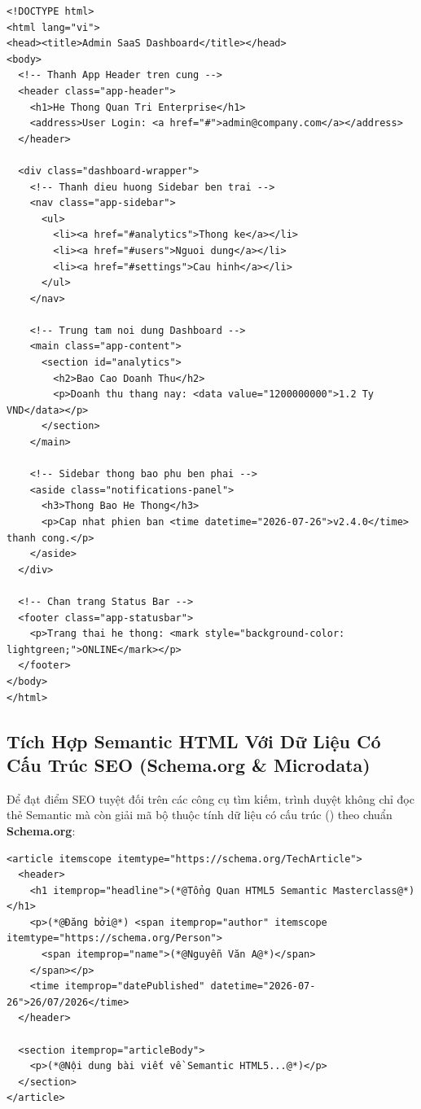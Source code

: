 \begin{codeWindowBreakable}
\begin{lstlisting}[language=HTML5]
<!DOCTYPE html>
<html lang="vi">
<head><title>Admin SaaS Dashboard</title></head>
<body>
  <!-- Thanh App Header tren cung -->
  <header class="app-header">
    <h1>He Thong Quan Tri Enterprise</h1>
    <address>User Login: <a href="#">admin@company.com</a></address>
  </header>

  <div class="dashboard-wrapper">
    <!-- Thanh dieu huong Sidebar ben trai -->
    <nav class="app-sidebar">
      <ul>
        <li><a href="#analytics">Thong ke</a></li>
        <li><a href="#users">Nguoi dung</a></li>
        <li><a href="#settings">Cau hinh</a></li>
      </ul>
    </nav>

    <!-- Trung tam noi dung Dashboard -->
    <main class="app-content">
      <section id="analytics">
        <h2>Bao Cao Doanh Thu</h2>
        <p>Doanh thu thang nay: <data value="1200000000">1.2 Ty VND</data></p>
      </section>
    </main>

    <!-- Sidebar thong bao phu ben phai -->
    <aside class="notifications-panel">
      <h3>Thong Bao He Thong</h3>
      <p>Cap nhat phien ban <time datetime="2026-07-26">v2.4.0</time> thanh cong.</p>
    </aside>
  </div>

  <!-- Chan trang Status Bar -->
  <footer class="app-statusbar">
    <p>Trang thai he thong: <mark style="background-color: lightgreen;">ONLINE</mark></p>
  </footer>
</body>
</html>
\end{lstlisting}
\end{codeWindowBreakable}

\clearpage
\subsection{Tích Hợp Semantic HTML Với Dữ Liệu Có Cấu Trúc SEO (Schema.org \& Microdata)}

Để đạt điểm SEO tuyệt đối trên các công cụ tìm kiếm, trình duyệt không chỉ đọc thẻ Semantic mà còn giải mã bộ thuộc tính dữ liệu có cấu trúc () theo chuẩn \textbf{Schema.org}:

\begin{codeWindow}
\begin{lstlisting}[language=HTML5]
<article itemscope itemtype="https://schema.org/TechArticle">
  <header>
    <h1 itemprop="headline">(*@Tổng Quan HTML5 Semantic Masterclass@*)</h1>
    <p>(*@Đăng bởi@*) <span itemprop="author" itemscope itemtype="https://schema.org/Person">
      <span itemprop="name">(*@Nguyễn Văn A@*)</span>
    </span></p>
    <time itemprop="datePublished" datetime="2026-07-26">26/07/2026</time>
  </header>

  <section itemprop="articleBody">
    <p>(*@Nội dung bài viết về Semantic HTML5...@*)</p>
  </section>
</article>
\end{lstlisting}
\end{codeWindow}

